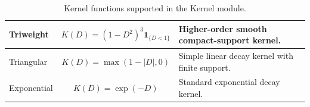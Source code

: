 \begin{table}[H]
\begin{tabularx}{\textwidth}{|l|c|X|}
        Triweight                                   &
        $K(D) = (1 - D^2)^3 \mathbf{1}_{\{D < 1\}}$ &
        Higher-order smooth compact-support kernel.                                                    \\
        \hline

        Triangular                                  &
        $K(D) = \max(1 - |D|, 0)$                   &
        Simple linear decay kernel with finite support.                                                \\
        \hline

        Exponential                                 &
        $K(D) = \exp(-D)$                           &
        Standard exponential decay kernel.                                                             \\
        \hline
    \end{tabularx}
    \caption{Kernel functions supported in the Kernel module.}
    \label{tab:kernel_functions}
\end{table}

